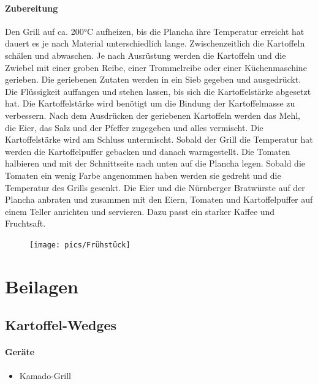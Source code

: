 \paragraph{Zubereitung}
Den Grill auf ca. 200°C aufheizen, bis die Plancha ihre Temperatur erreicht hat 
dauert es je nach Material unterschiedlich lange. Zwischenzeitlich die Kartoffeln 
schälen und abwaschen. Je nach Ausrüstung werden die Kartoffeln und die 
Zwiebel mit einer groben Reibe, einer Trommelreibe oder einer 
Küchenmaschine gerieben. Die geriebenen Zutaten werden in ein Sieb gegeben 
und ausgedrückt. Die Flüssigkeit auffangen und stehen lassen, bis sich die 
Kartoffelstärke abgesetzt hat. Die Kartoffelstärke wird benötigt um die Bindung 
der Kartoffelmasse zu verbessern. Nach dem Ausdrücken der geriebenen Kartoffeln werden das Mehl, die 
Eier, das Salz und der Pfeffer zugegeben und alles vermischt. Die 
Kartoffelstärke wird am Schluss untermischt. Sobald der Grill die Temperatur 
hat werden die Kartoffelpuffer gebacken und danach warmgestellt. Die 
Tomaten halbieren und mit der Schnittseite nach unten auf die Plancha legen. Sobald 
die Tomaten ein wenig Farbe angenommen haben werden sie gedreht und die 
Temperatur des Grills gesenkt. Die Eier und die Nürnberger Bratwürste auf der 
Plancha anbraten und zusammen mit den Eiern, Tomaten und Kartoffelpuffer 
auf einem Teller anrichten und servieren. Dazu passt ein starker Kaffee und 
Fruchtsaft.


\begin{figure}[htbp]
	\centering
	\begin{minipage}{1\textwidth}
		\centering
		\texttt{[image: pics/Frühstück]}
		\label{fig:Früstück}
	\end{minipage}
\end{figure}
\newpage

\section{Beilagen}

\subsection{Kartoffel-Wedges}

\paragraph{Geräte}

\begin{itemize}[noitemsep]
	\item Kamado-Grill
\end{itemize}

